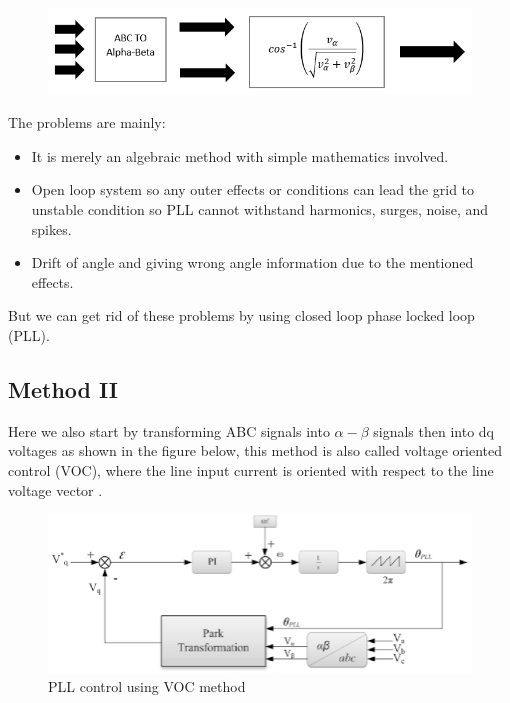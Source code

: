 \documentclass[12pt,a4paper]{book}
\begin{document}
\begin{figure}[h]
  \centering
  \includegraphics[width=13cm]{image0.png}
  \label{fig:image0}
\end{figure}

The problems are mainly:
\begin{itemize}
  \item It is merely an algebraic method with simple mathematics involved.
  \item Open loop system so any outer effects or conditions can lead the grid to unstable condition so PLL cannot withstand harmonics, surges, noise, and spikes.
  \item Drift of angle and giving wrong angle information due to the mentioned effects.
\end{itemize}
But we can get rid of these problems by using closed loop phase locked loop (PLL).

\subsection{Method II}
Here we also start by transforming ABC signals into \(\alpha - \beta\) signals then into dq voltages as shown in the figure below, this method is also called voltage oriented control (VOC), where the line input current is oriented with respect to the line voltage vector \cite{pll2016}.

\begin{figure}[h]
  \centering
  \includegraphics[width=13cm]{image14.png}
  \caption{PLL control using VOC method}
  \label{fig:image14}
\end{figure}
\end{document}
